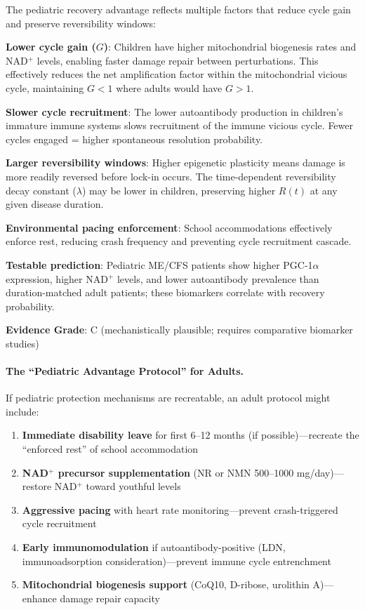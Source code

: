 \begin{hypothesis}
The pediatric recovery advantage reflects multiple factors that reduce cycle gain and preserve reversibility windows:

\textbf{Lower cycle gain ($G$)}: Children have higher mitochondrial biogenesis rates and NAD$^+$ levels, enabling faster damage repair between perturbations. This effectively reduces the net amplification factor within the mitochondrial vicious cycle, maintaining $G < 1$ where adults would have $G > 1$.

\textbf{Slower cycle recruitment}: The lower autoantibody production in children's immature immune systems slows recruitment of the immune vicious cycle. Fewer cycles engaged = higher spontaneous resolution probability.

\textbf{Larger reversibility windows}: Higher epigenetic plasticity means damage is more readily reversed before lock-in occurs. The time-dependent reversibility decay constant ($\lambda$) may be lower in children, preserving higher $R(t)$ at any given disease duration.

\textbf{Environmental pacing enforcement}: School accommodations effectively enforce rest, reducing crash frequency and preventing cycle recruitment cascade.

\textbf{Testable prediction}: Pediatric ME/CFS patients show higher PGC-1$\alpha$ expression, higher NAD$^+$ levels, and lower autoantibody prevalence than duration-matched adult patients; these biomarkers correlate with recovery probability.

\textbf{Evidence Grade}: C (mechanistically plausible; requires comparative biomarker studies)
\end{hypothesis}

\paragraph{The ``Pediatric Advantage Protocol'' for Adults.}

If pediatric protection mechanisms are recreatable, an adult protocol might include:

\begin{enumerate}
    \item \textbf{Immediate disability leave} for first 6--12 months (if possible)---recreate the ``enforced rest'' of school accommodation
    \item \textbf{NAD$^+$ precursor supplementation} (NR or NMN 500--1000 mg/day)---restore NAD$^+$ toward youthful levels
    \item \textbf{Aggressive pacing} with heart rate monitoring---prevent crash-triggered cycle recruitment
    \item \textbf{Early immunomodulation} if autoantibody-positive (LDN, immunoadsorption consideration)---prevent immune cycle entrenchment
    \item \textbf{Mitochondrial biogenesis support} (CoQ10, D-ribose, urolithin A)---enhance damage repair capacity
\end{enumerate}

